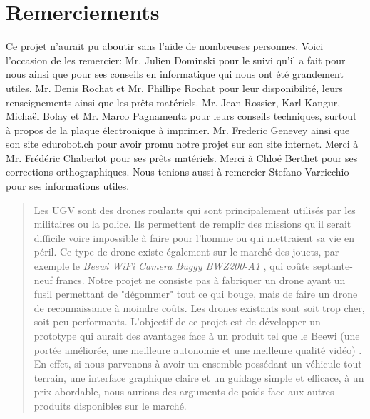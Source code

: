 \documentclass[a4paper,11pt]{report}
\begin{document}
{%

\clearpage
\setcounter{page}{2}
\section*{Remerciements}
Ce projet n'aurait pu aboutir sans l'aide de nombreuses personnes. Voici l'occasion de les remercier:  Mr. Julien Dominski pour le suivi qu'il a fait pour nous ainsi que pour ses conseils en informatique qui nous ont été grandement utiles. Mr. Denis Rochat et Mr. Phillipe Rochat pour leur disponibilité, leurs renseignements ainsi que les prêts matériels. Mr. Jean Rossier, Karl Kangur, Michaël Bolay et Mr. Marco Pagnamenta pour leurs conseils techniques, surtout à propos de la plaque électronique à imprimer. Mr. Frederic Genevey ainsi que son site edurobot.ch pour avoir promu notre projet sur son site internet. Merci à Mr. Frédéric Chaberlot pour ses prêts matériels. Merci à Chloé Berthet pour ses corrections orthographiques. Nous tenions aussi à remercier Stefano Varricchio pour ses informations utiles.

\clearpage

\begin{abstract}

Les UGV sont des drones roulants qui sont principalement utilisés par les militaires ou la police. Ils permettent de remplir des missions qu'il serait
difficile voire impossible à faire pour l'homme ou qui mettraient sa vie en péril. Ce type de drone existe également sur le marché des jouets, par exemple le \textit{Beewi WiFi Camera Buggy BWZ200-A1} \cite{beewi}, qui coûte septante-neuf francs.
Notre projet ne consiste pas à fabriquer un drone ayant un fusil permettant de "dégommer" tout ce qui
bouge, mais de faire un drone de reconnaissance à moindre coûts. Les drones
existants sont soit trop cher, soit peu performants.  L'objectif de ce projet est de développer un prototype qui aurait des avantages face à un produit tel que le Beewi\cite{beewi} (une portée améliorée, une meilleure autonomie et une meilleure qualité vidéo) . En effet, si nous parvenons à avoir un ensemble possédant un
véhicule tout terrain, une interface graphique claire et un guidage simple et efficace, à un prix abordable,  
nous aurions des arguments de poids face aux autres produits disponibles sur le
marché.


\end{abstract}}
\end{document}
